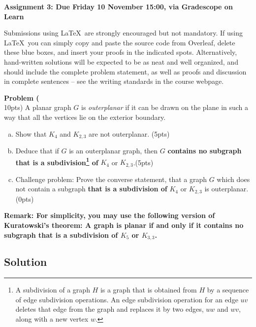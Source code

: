 \documentclass{article}
\newenvironment{problem}[2][Problem]
    { \begin{mdframed}[backgroundcolor=gray!20] \textbf{#1 #2} \\}
    {  \end{mdframed}}
\begin{document}
\begin{centering}\textbf{Assignment 3: Due Friday 10 November 15:00, via Gradescope on Learn}\end{centering}

\begin{mdframed}[backgroundcolor=blue!20]
Submissions using \LaTeX\ are strongly encouraged but not mandatory. If using \LaTeX\, you can simply copy and paste the source code from Overleaf, delete these blue boxes, and insert your proofs in the indicated spots. Alternatively, hand-written solutions will be expected to be as neat and well organized, and should include the complete problem statement, as well as proofs and discussion in complete sentences -- see the writing standards in the course webpage.
\end{mdframed}




\begin{problem}{1} (10pts)
A planar graph $G$ is \emph{outerplanar} if it can be drawn on the plane in such a way that all the vertices lie on the exterior boundary.
\begin{enumerate}[(a)]
    \item Show that $K_4$ and $K_{2,3}$ are not outerplanar. (5pts)
    \item Deduce that if $G$ is an outerplanar graph, then $G$ \textbf{contains no subgraph that is a subdivision\footnote{A subdivision of a graph $H$ is a graph that is obtained from $H$  by a sequence of edge subdivision operations. An edge subdivision operation for an edge $uv$ deletes that edge from the graph and replaces it by two edges, $uw$ and $wv$, along with a new vertex $w$.}  of} $K_4$ or $K_{2,3}$.(5pts)
    \item Challenge problem: Prove the converse statement, that a graph $G$ which does not contain a subgraph \textbf{that is a subdivision of}  $K_4$ or $K_{2,3}$ is outerplanar. (0pts)
\end{enumerate}

\noindent\textbf{Remark: For simplicity, you may use the following version of Kuratowski's theorem: A graph is planar if and only if it contains no subgraph that is a subdivision of $K_5$ or $K_{3,3}$.}
\end{problem}

\subsection*{Solution}
\end{document}
